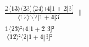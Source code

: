 \documentclass[varwidth, border=5pt]{standalone}
\begin{document}
\begin{my}
$\begin{gathered}
\scriptscriptstyle\frac{2⟨13⟩⟨23⟩⟨24⟩⟨4|1+2|3]}{⟨12⟩³⟨2|1+4|3]} +\\
\scriptscriptstyle\frac{1⟨23⟩²⟨4|1+2|3]²}{⟨12⟩²⟨2|1+4|3]²} \phantom{+}
\end{gathered}$
\end{my}
\end{document}
